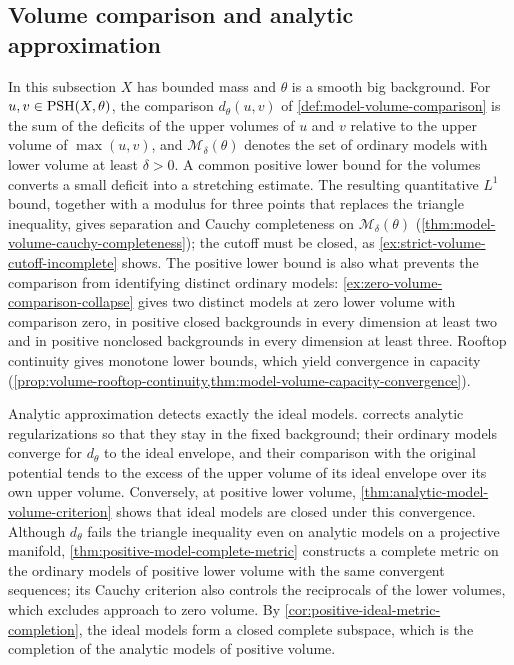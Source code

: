 \subsection{Volume comparison and analytic approximation}

In this subsection $X$ has bounded mass and $\theta$ is a smooth big background. For $u,v\in\mathrm{PSH}(X,\theta)$, the comparison $d_\theta(u,v)$ of \cref{def:model-volume-comparison} is the sum of the deficits of the upper volumes of $u$ and $v$ relative to the upper volume of $\max(u,v)$, and $\mathcal M_\delta(\theta)$ denotes the set of ordinary models with lower volume at least $\delta>0$. A common positive lower bound for the volumes converts a small deficit into a stretching estimate. The resulting quantitative $L^1$ bound, together with a modulus for three points that replaces the triangle inequality, gives separation and Cauchy completeness on $\mathcal M_\delta(\theta)$ (\cref{thm:model-volume-cauchy-completeness}); the cutoff must be closed, as \cref{ex:strict-volume-cutoff-incomplete} shows. The positive lower bound is also what prevents the comparison from identifying distinct ordinary models: \cref{ex:zero-volume-comparison-collapse} gives two distinct models at zero lower volume with comparison zero, in positive closed backgrounds in every dimension at least two and in positive nonclosed backgrounds in every dimension at least three. Rooftop continuity gives monotone lower bounds, which yield convergence in capacity (\cref{prop:volume-rooftop-continuity,thm:model-volume-capacity-convergence}).

Analytic approximation detects exactly the ideal models.  corrects analytic regularizations so that they stay in the fixed background; their ordinary models converge for $d_\theta$ to the ideal envelope, and their comparison with the original potential tends to the excess of the upper volume of its ideal envelope over its own upper volume. Conversely, at positive lower volume, \cref{thm:analytic-model-volume-criterion} shows that ideal models are closed under this convergence. Although $d_\theta$ fails the triangle inequality even on analytic models on a projective manifold, \cref{thm:positive-model-complete-metric} constructs a complete metric on the ordinary models of positive lower volume with the same convergent sequences; its Cauchy criterion also controls the reciprocals of the lower volumes, which excludes approach to zero volume. By \cref{cor:positive-ideal-metric-completion}, the ideal models form a closed complete subspace, which is the completion of the analytic models of positive volume.

